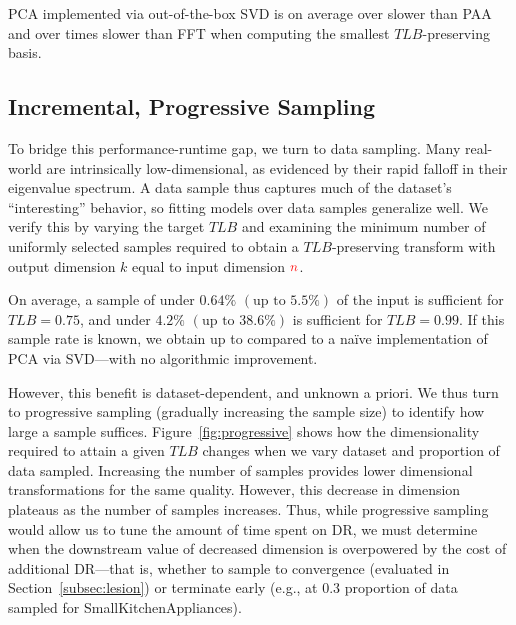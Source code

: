 PCA implemented via out-of-the-box SVD is on average over  slower than PAA and over  times slower than FFT when computing the smallest $TLB$-preserving basis.


\subsection{Incremental, Progressive Sampling}
To bridge this performance-runtime gap, we turn to data sampling. 
Many real-world  are intrinsically low-dimensional, as evidenced by their rapid falloff in their eigenvalue spectrum.
A data sample thus captures much of the dataset's ``interesting'' behavior, so fitting models over data samples generalize well. 
We verify this by varying the target $TLB$ and examining the minimum number of uniformly selected samples required to obtain a $TLB$-preserving transform with output dimension $k$ equal to input dimension ${\color{red}n}$.

On average, a sample of under $0.64\%$ $(\text{up to } 5.5\%)$ of the input is sufficient for $TLB = 0.75$, and under $4.2\%$ $(\text{up to } 38.6\%)$ is sufficient for $TLB=0.99$.  
If this sample rate is known, we obtain up to  compared to a na\"ive implementation of PCA via SVD---with no algorithmic improvement. 

However, this benefit is dataset-dependent, and unknown a priori.
We thus turn to progressive sampling (gradually increasing the sample size) to identify how large a sample suffices.
Figure~\ref{fig:progressive} shows how the dimensionality required to attain a given $TLB$ changes when we vary dataset and proportion of data sampled.
Increasing the number of samples provides lower dimensional transformations for the same quality.
However, this decrease in dimension plateaus as the number of samples increases.
Thus, while progressive sampling would allow us to tune the amount of time spent on DR, we must determine when the downstream value of decreased dimension is overpowered by the cost of additional DR---that is, whether to sample to convergence (evaluated in Section~\ref{subsec:lesion}) or terminate early (e.g., at $0.3$ proportion of data sampled for SmallKitchenAppliances). 

